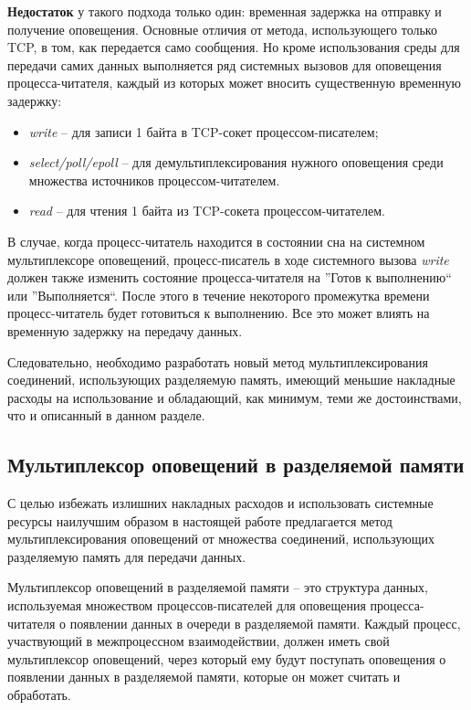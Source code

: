 \textbf{Недостаток} у такого подхода только один: временная задержка на отправку и получение оповещения. Основные отличия от метода, использующего только TCP, в том, как передается само сообщения. Но кроме использования среды для передачи самих данных выполняется ряд системных вызовов для оповещения процесса-читателя, каждый из которых может вносить существенную временную задержку:
\begin{itemize}
\item \textit{write} -- для записи 1 байта в TCP-сокет процессом-писателем;
\item \textit{select/poll/epoll} -- для демультиплексирования нужного оповещения среди множества источников процессом-читателем.
\item \textit{read} -- для чтения 1 байта из TCP-сокета процессом-читателем.
\end{itemize}

В случае, когда процесс-читатель находится в состоянии сна на системном мультиплексоре оповещений, процесс-писатель в ходе системного вызова \textit{write} должен также изменить состояние процесса-читателя на ''Готов к выполнению`` или ''Выполняется``. После этого в течение некоторого промежутка времени процесс-читатель будет готовиться к выполнению. Все это может влиять на временную задержку на передачу данных.

Следовательно, необходимо разработать новый метод мультиплексирования соединений, использующих разделяемую память, имеющий меньшие накладные расходы на использование и обладающий, как минимум, теми же достоинствами, что и описанный в данном разделе. 

\subsection{Мультиплексор оповещений в разделяемой памяти}\label{chapter31:Mux}

С целью избежать излишних накладных расходов и использовать системные ресурсы наилучшим образом в настоящей работе предлагается метод мультиплексирования оповещений от множества соединений, использующих разделяемую память для передачи данных.

Мультиплексор оповещений в разделяемой памяти -- это структура данных, используемая множеством процессов-писателей для оповещения процесса-читателя о появлении данных в очереди в разделяемой памяти. Каждый процесс, участвующий в межпроцессном взаимодействии, должен иметь свой мультиплексор оповещений, через который ему будут поступать оповещения о появлении данных в разделяемой памяти, которые он может считать и обработать.

